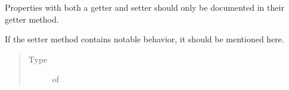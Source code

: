 \documentclass[letterpaper,10pt,english]{sphinxmanual}
\begin{document}
\begin{fulllineitems}
\begin{fulllineitems}
\label{\detokenize{source/example:example.ExampleClass.readwrite_property}}
\pysigstartsignatures
{}
\pysigstopsignatures
\sphinxAtStartPar
Properties with both a getter and setter
should only be documented in their getter method.

\sphinxAtStartPar
If the setter method contains notable behavior, it should be
mentioned here.
\begin{quote}\begin{description}
\item[{Type}] \leavevmode
\sphinxAtStartPar
{} of 

\end{description}\end{quote}

\end{fulllineitems}


\end{fulllineitems}

\end{document}
